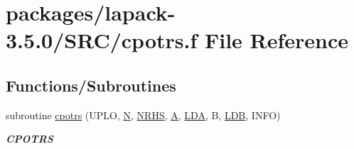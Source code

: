 \hypertarget{cpotrs_8f}{}\section{packages/lapack-\/3.5.0/\+S\+R\+C/cpotrs.f File Reference}
\label{cpotrs_8f}
\subsection*{Functions/\+Subroutines}
\begin{DoxyCompactItemize}
\item 
subroutine \hyperlink{group__complexPOcomputational_gad9052b4b70569dfd6e8943971c9b38b2}{cpotrs} (U\+P\+L\+O, \hyperlink{polmisc_8c_a0240ac851181b84ac374872dc5434ee4}{N}, \hyperlink{example__user_8c_aa0138da002ce2a90360df2f521eb3198}{N\+R\+H\+S}, \hyperlink{classA}{A}, \hyperlink{example__user_8c_ae946da542ce0db94dced19b2ecefd1aa}{L\+D\+A}, B, \hyperlink{example__user_8c_a50e90a7104df172b5a89a06c47fcca04}{L\+D\+B}, I\+N\+F\+O)
\begin{DoxyCompactList}\small\item\em {\bfseries C\+P\+O\+T\+R\+S} \end{DoxyCompactList}\end{DoxyCompactItemize}
